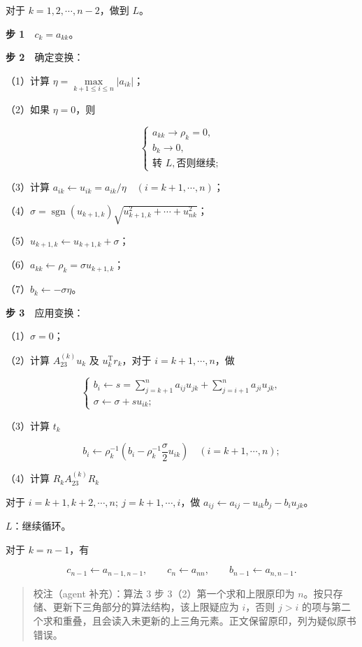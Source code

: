 对于 \(k=1,2,\cdots,n-2\)，做到 \(L\)。

\textbf{步 1}　\(c_k=a_{kk}\)。

\textbf{步 2}　确定变换：

（1）计算 \(\eta=\max\limits_{k+1\leq i\leq n}|a_{ik}|\)；

（2）如果 \(\eta=0\)，则

\[
\begin{cases}
a_{kk}\to\rho_k=0,\\
b_k\to0,\\
\text{转 }L,\text{否则继续};
\end{cases}
\]

（3）计算 \(a_{ik}\leftarrow u_{ik}=a_{ik}/\eta\quad(i=k+1,\cdots,n)\)；

（4）\(\sigma=\operatorname{sgn}(u_{k+1,k})\sqrt{u_{k+1,k}^2+\cdots+u_{nk}^2}\)；

（5）\(u_{k+1,k}\leftarrow u_{k+1,k}+\sigma\)；

（6）\(a_{kk}\leftarrow\rho_k=\sigma u_{k+1,k}\)；

（7）\(b_k\leftarrow-\sigma\eta\)。

\textbf{步 3}　应用变换：

（1）\(\sigma=0\)；

（2）计算 \(A_{23}^{(k)}u_k\) 及 \(u_k^{\mathrm T}r_k\)，对于 \(i=k+1,\cdots,n\)，做

\[
\begin{cases}
b_i\leftarrow s=\displaystyle\sum_{j=k+1}^{n}a_{ij}u_{jk}+\displaystyle\sum_{j=i+1}^{n}a_{ji}u_{jk},\\
\sigma\leftarrow\sigma+su_{ik};
\end{cases}
\]

（3）计算 \(t_k\)

\[
b_i\leftarrow\rho_k^{-1}\left(b_i-\rho_k^{-1}\frac\sigma2u_{ik}\right)
\quad(i=k+1,\cdots,n);
\]

（4）计算 \(R_kA_{23}^{(k)}R_k\)

对于 \(i=k+1,k+2,\cdots,n;\ j=k+1,\cdots,i\)，做 \(a_{ij}\leftarrow a_{ij}-u_{ik}b_j-b_iu_{jk}\)。

\(L\)：继续循环。

对于 \(k=n-1\)，有

\[
c_{n-1}\leftarrow a_{n-1,n-1},\qquad c_n\leftarrow a_{nn},\qquad b_{n-1}\leftarrow a_{n,n-1}.
\]

\begin{quote}
校注（agent 补充）：算法 3 步 3（2）第一个求和上限原印为 \(n\)。按只存储、更新下三角部分的算法结构，该上限疑应为 \(i\)，否则 \(j>i\) 的项与第二个求和重叠，且会读入未更新的上三角元素。正文保留原印，列为疑似原书错误。
\end{quote}

